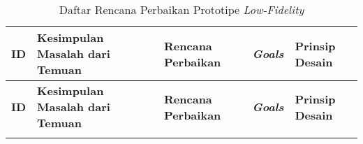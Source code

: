 \RaggedLeft
\begin{footnotesize}
\begin{longtable}[c]{|W{c}{0.06\textwidth}|>{\ccnormspacing}m{0.31\textwidth}|>{\ccnormspacing}m{0.31\textwidth}|>{\ccnormspacingcenter}m{0.07\textwidth}|>{\ccnormspacingcenter}m{0.09\textwidth}|}
  \caption{Daftar Rencana Perbaikan Prototipe \textit{Low-Fidelity}}
  \label{tab:daftar_perbaikan_lofi} \\
  \hline {}
  \textbf{ID} & \centering\textbf{Kesimpulan Masalah dari Temuan} & \centering\textbf{Rencana Perbaikan} & \textbf{\textit{Goals}}  & \textbf{Prinsip Desain} \\ \hline \endfirsthead
  \hline {}
  \textbf{ID} & \centering\textbf{Kesimpulan Masalah dari Temuan} & \centering\textbf{Rencana Perbaikan} & \textbf{\textit{Goals}}  & \textbf{Prinsip Desain} \\ \hline \endhead
  \hline \endfoot


\end{longtable}
\end{footnotesize}
